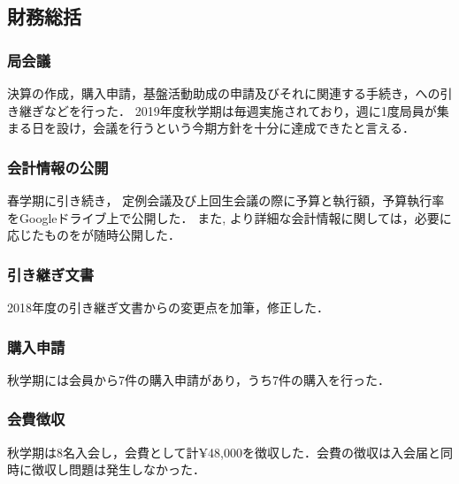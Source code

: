 \subsection*{財務総括}

\subsubsection*{局会議}
決算の作成，購入申請，基盤活動助成の申請及びそれに関連する手続き，\firstGrade{}への引き継ぎなどを行った．
2019年度秋学期は毎週実施されており，週に1度局員が集まる日を設け，会議を行うという今期方針を十分に達成できたと言える．

\subsubsection*{会計情報の公開}
春学期に引き続き， 定例会議及び上回生会議の際に予算と執行額，予算執行率をGoogleドライブ上で公開した．
また, より詳細な会計情報に関しては，必要に応じたものを\kaikeiStaff{}が随時公開した．

\subsubsection*{引き継ぎ文書}
2018年度の引き継ぎ文書からの変更点を加筆，修正した．

\subsubsection*{購入申請}
秋学期には会員から7件の購入申請があり，うち7件の購入を行った．

\subsubsection*{会費徴収}
秋学期は8名入会し，会費として計¥48,000を徴収した．会費の徴収は入会届と同時に徴収し問題は発生しなかった．
